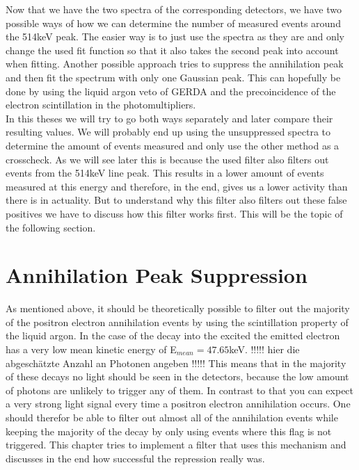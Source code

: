 Now that we have the two spectra of the corresponding detectors, we have two possible ways of how we can determine the number of measured events around the 514keV peak.
The easier way is to just use the spectra as they are and only change the used fit function so that it also takes the second peak into account when fitting.
Another possible approach tries to suppress the annihilation peak and then fit the spectrum with only one Gaussian peak.
This can hopefully be done by using the liquid argon veto of GERDA and the precoincidence of the electron scintillation in the photomultipliers. 
\\ 

In this theses we will try to go both ways separately and later compare their resulting values.
We will probably end up using the unsuppressed spectra to determine the amount of events measured and only use the other method as a crosscheck.
As we will see later this is because the used filter also filters out events from the 514keV line peak.
This results in a lower amount of events measured at this energy and therefore, in the end, gives us a lower activity than there is in actuality. 
But to understand why this filter also filters out these false positives we have to discuss how this filter works first.
This will be the topic of the following section.
\\

\section{Annihilation Peak Suppression}
\label{sec:APS}

As mentioned above, it should be theoretically possible to filter out the majority of the positron electron annihilation events by using the scintillation property of the liquid argon.
In the case of the \Kr decay into the excited  the emitted electron has a very low mean kinetic energy of E\(_{mean}=47.65\)keV.
!!!!! hier die abgeschätzte Anzahl an Photonen angeben !!!!!
This means that in the majority of these decays no light should be seen in the detectors, because the low amount of photons are unlikely to trigger any of them.
In contrast to that you can expect a very strong light signal every time a positron electron annihilation occurs. 
One should therefor be able to filter out almost all of the annihilation events while keeping the majority of the \Kr decay by only using events where this flag is not triggered.
This chapter tries to implement a filter that uses this mechanism and discusses in the end how successful the repression really was.
\\

